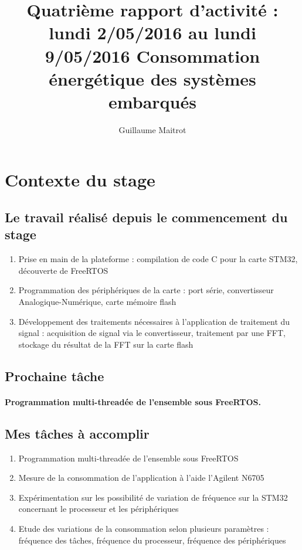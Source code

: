 \documentclass[a4paper]{article}
\title{Quatrième rapport d'activité : lundi 2/05/2016 au lundi 9/05/2016 }
\author{Guillaume Maitrot}
\begin{document}
\maketitle

\begin{center}
\centering
\title{Consommation énergétique des systèmes embarqués}
\end{center}

\section{Contexte du stage}

 \subsection{Le travail réalisé depuis le commencement du stage}
 \begin{enumerate}
\item {Prise en main de la plateforme : compilation de code C pour la carte STM32, découverte de FreeRTOS}
\item {Programmation des périphériques de la carte : port série,
convertisseur Analogique-Numérique, carte mémoire flash}
\item {Développement des traitements nécessaires à l'application de
traitement du signal : acquisition de signal via le convertisseur,
traitement par une FFT, stockage du résultat de la FFT sur la carte
flash}
\end{enumerate}

 \subsection{Prochaine tâche}
    \paragraph{Programmation multi-threadée de l'ensemble sous FreeRTOS.}
    
\subsection{Mes tâches à accomplir}
\begin{enumerate}
\item { Programmation multi-threadée de l'ensemble sous FreeRTOS}
\item {Mesure de la consommation de l'application à l'aide l'Agilent
N6705}
\item {Expérimentation sur les possibilité de variation de fréquence sur la
STM32 concernant le processeur et les périphériques}
\item {Etude des variations de la consommation selon plusieurs paramètres :
fréquence des tâches, fréquence du processeur, fréquence des
périphériques}
\end{enumerate}
\end{document}
